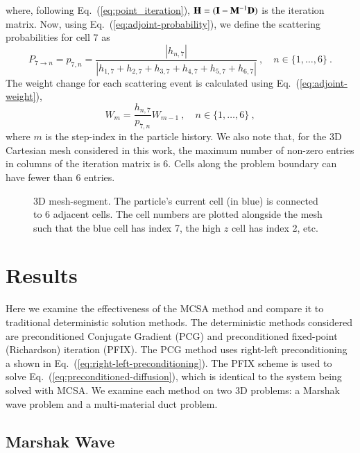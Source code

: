 \documentclass[preprint,12pt]{elsarticle}
\newcommand{\vI}{\ensuremath{\ve{I}}}
\begin{document}
where, following Eq.~(\ref{eq:point_iteration}), $\ve{H} = (\vI -
\ve{M}^{-1}\ve{D})$ is the iteration matrix.  Now, using
Eq.~(\ref{eq:adjoint-probability}), we define the scattering
probabilities for cell 7 as
\begin{equation*}
  P_{7\rightarrow n} = p_{7,n} = \frac{|h_{n,7}|}{|h_{1,7} + 
    h_{2,7} + h_{3,7} + h_{4,7} + h_{5,7} + h_{6,7}|}\:,\quad
  n\in \{1,\ldots,6\}\:.
\end{equation*}
The weight change for each scattering event is calculated using
Eq.~(\ref{eq:adjoint-weight}),
\begin{equation*}
  W_{m} = \frac{h_{n,7}}{p_{7,n}}W_{m-1}\:,\quad
  n\in \{1,\ldots,6\}\:,
\end{equation*}
where $m$ is the step-index in the particle history.  We also note
that, for the 3D Cartesian mesh considered in this work, the maximum
number of non-zero entries in columns of the iteration matrix is 6.
Cells along the problem boundary can have fewer than 6 entries.

\begin{figure}[htpb!]
  \centerline{
    }
  \caption{3D mesh-segment.  The particle's current cell (in blue) is
    connected to 6 adjacent cells.  The cell numbers are plotted
    alongside the mesh such that the blue cell has index 7, the high
    $z$ cell has index 2, etc.}
  \label{fig:mesh_segment}
\end{figure}

\section{Results}
\label{sec:results}

Here we examine the effectiveness of the MCSA method and compare it to
traditional deterministic solution methods.  The deterministic methods
considered are preconditioned Conjugate Gradient (PCG) and
preconditioned fixed-point (Richardson) iteration (PFIX).  The PCG
method uses right-left preconditioning a shown in
Eq.~(\ref{eq:right-left-preconditioning}).  The PFIX scheme is used to
solve Eq.~(\ref{eq:preconditioned-diffusion}), which is identical to
the system being solved with MCSA.  We examine each method on two 3D
problems: a Marshak wave problem and a multi-material duct problem.

\subsection{Marshak Wave}
\end{document}

